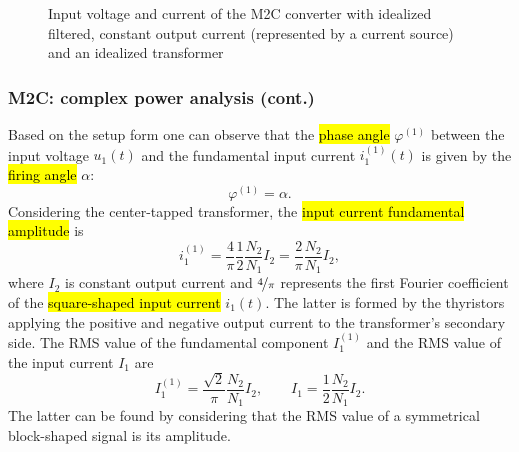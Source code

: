 \begin{frame}[c]
\begin{figure}
     \caption{Input voltage and current of the M2C converter with idealized filtered, constant output current (represented by a current source) and an idealized transformer}
     \label{fig:M2C_inputs}
 \end{figure}
\end{frame}

\begin{frame}[c]
    \frametitle{M2C: complex power analysis (cont.)}
    Based on the setup form  one can observe that the \hl{phase angle} $\varphi^{(1)}$ between the input voltage $u_1(t)$ and the fundamental input current $i^{(1)}_1(t)$ is given by the \hl{firing angle} $\alpha$:
    $$
    \varphi^{(1)} = \alpha.
    $$\pause
    Considering the center-tapped transformer, the \hl{input current fundamental amplitude} is
    \begin{equation}
        i^{(1)}_1 = \frac{4}{\pi} \frac{1}{2}\frac{N_2}{N_1} I_2 = \frac{2}{\pi} \frac{N_2}{N_1} I_2,
    \end{equation}
    where $I_2$ is constant output current and $\nicefrac{4}{\pi}$ represents the first Fourier coefficient of the \hl{square-shaped input current} $i_1(t)$. \pause The latter is formed by the thyristors applying the positive and negative output current to the transformer's secondary side. \pause The RMS value of the fundamental component $I^{(1)}_1$ and the RMS value of the input current $I_1$ are
    \begin{equation}
        I^{(1)}_1 = \frac{\sqrt{2}}{\pi} \frac{N_2}{N_1} I_2, \qquad I_1 = \frac{1}{2}\frac{N_2}{N_1} I_2.
    \end{equation}\pause
    The latter can be found by considering that the RMS value of a symmetrical block-shaped signal is its amplitude.
\end{frame}

